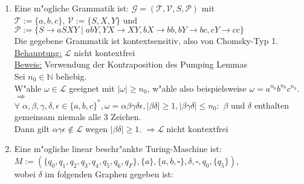 \documentclass[10pt,oneside,onecolumn,a4paper,german,titlepage]{article}
\begin{document}
\begin{enumerate}
\item Eine m"ogliche Grammatik ist: $\mathcal{G} = (\mathcal{T},\mathcal{V},S,
\mathcal{P})$ mit\\
$\mathcal{T} := \{a,b,c\}$, $\mathcal{V} := \{S,X,Y\}$ und\\
$\mathcal{P} := \{S \rightarrow aSXY \; | \; abY, YX \rightarrow XY,
bX \rightarrow bb, bY \rightarrow bc, cY \rightarrow cc\}$\\
Die gegebene Grammatik ist kontextsensitiv, also von Chomsky-Typ 1.\\[4pt]
\underline{Behauptung:} $\mathcal{L}$ nicht kontextfrei\\
\underline{Beweis:} Verwendung der Kontraposition des Pumping Lemmas\\
Sei $n_0 \in \mathbb{N}$ beliebig.\\
W"ahle $\omega \in \mathcal{L}$ geeignet mit $|\omega| \geq n_0$, w"ahle also
beispielsweise $\omega = a^{n_0}b^{n_0}c^{n_0}$. $\Rightarrow$\\
$\forall \; \alpha,\beta,\gamma,\delta,\epsilon \in \{a,b,c\}^*, \omega =
\alpha\beta\gamma\delta\epsilon, |\beta\delta| \geq 1, |\beta\gamma\delta|
\leq  n_0:$ $\beta$ und $\delta$ enthalten gemeinsam niemals alle 3 Zeichen.\\
Dann gilt $\alpha\gamma\epsilon \notin \mathcal{L}$ wegen $|\beta\delta| \geq 1$.
$\Rightarrow \mathcal{L} \; \mbox{nicht kontextfrei}$
\item Eine m"ogliche linear beschr"ankte Turing-Maschine ist:\\
$M := (\{q_0,q_1,q_2,q_3,q_4,q_5,q_6,q_F\}, \{a\}, \{a,b,\square\}, \delta,
\square, q_0, \{q_5\})$,\\
wobei $\delta$ im folgenden Graphen gegeben ist:
\begin{center}
\end{center}
\end{enumerate}
\end{document}
